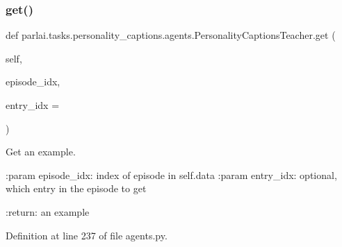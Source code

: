 \subsubsection{\texorpdfstring{get()}{get()}}
{\footnotesize\ttfamily def parlai.\+tasks.\+personality\+\_\+captions.\+agents.\+Personality\+Captions\+Teacher.\+get (\begin{DoxyParamCaption}\item[{}]{self,  }\item[{}]{episode\+\_\+idx,  }\item[{}]{entry\+\_\+idx = {} }\end{DoxyParamCaption})}

\begin{DoxyVerb}Get an example.

:param episode_idx:
    index of episode in self.data
:param entry_idx:
    optional, which entry in the episode to get

:return:
    an example
\end{DoxyVerb}
 

Definition at line 237 of file agents.\+py.


